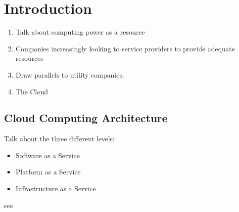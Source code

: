 \chapter{Introduction}
\begin{enumerate}
\item Talk about computing power as a resource
\item Companies increasingly looking to service providers to provide adequate resources
\item Draw parallels to utility companies.
\item The Cloud
\end{enumerate}

\section{Cloud Computing Architecture}
Talk about the three different levels:
\begin{itemize}
\item Software as a Service
\item Platform as a Service
\item Infrastructure as a Service
\end{itemize}
see \cite{Aneka}

